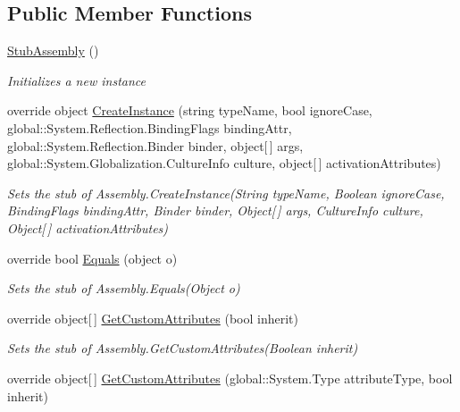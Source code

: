 \subsection*{Public Member Functions}
\begin{DoxyCompactItemize}
\item 
\hyperlink{class_system_1_1_reflection_1_1_fakes_1_1_stub_assembly_a2f36c7ca133df5493c248bc28325ab81}{Stub\-Assembly} ()
\begin{DoxyCompactList}\small\item\em Initializes a new instance\end{DoxyCompactList}\item 
override object \hyperlink{class_system_1_1_reflection_1_1_fakes_1_1_stub_assembly_aabab844d93a61f0c6a17ffbf3f7b1ffb}{Create\-Instance} (string type\-Name, bool ignore\-Case, global\-::\-System.\-Reflection.\-Binding\-Flags binding\-Attr, global\-::\-System.\-Reflection.\-Binder binder, object\mbox{[}$\,$\mbox{]} args, global\-::\-System.\-Globalization.\-Culture\-Info culture, object\mbox{[}$\,$\mbox{]} activation\-Attributes)
\begin{DoxyCompactList}\small\item\em Sets the stub of Assembly.\-Create\-Instance(\-String type\-Name, Boolean ignore\-Case, Binding\-Flags binding\-Attr, Binder binder, Object\mbox{[}$\,$\mbox{]} args, Culture\-Info culture, Object\mbox{[}$\,$\mbox{]} activation\-Attributes)\end{DoxyCompactList}\item 
override bool \hyperlink{class_system_1_1_reflection_1_1_fakes_1_1_stub_assembly_ac6d6da8910ee879d37b7e57f84383f31}{Equals} (object o)
\begin{DoxyCompactList}\small\item\em Sets the stub of Assembly.\-Equals(\-Object o)\end{DoxyCompactList}\item 
override object\mbox{[}$\,$\mbox{]} \hyperlink{class_system_1_1_reflection_1_1_fakes_1_1_stub_assembly_a652c63c22de4503b8fe2e142ebe72498}{Get\-Custom\-Attributes} (bool inherit)
\begin{DoxyCompactList}\small\item\em Sets the stub of Assembly.\-Get\-Custom\-Attributes(\-Boolean inherit)\end{DoxyCompactList}\item 
override object\mbox{[}$\,$\mbox{]} \hyperlink{class_system_1_1_reflection_1_1_fakes_1_1_stub_assembly_a19a963ce5986970874deb28055951b34}{Get\-Custom\-Attributes} (global\-::\-System.\-Type attribute\-Type, bool inherit)

\end{DoxyCompactItemize}

